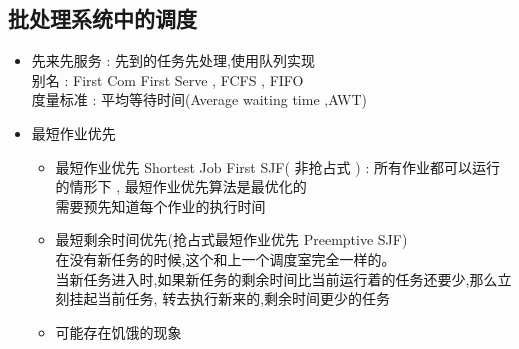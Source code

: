 \documentclass[UTF8,a4paper]{ctexart}
\begin{document}
\subsection{批处理系统中的调度}
\begin{itemize}
	\item 先来先服务 : 先到的任务先处理,使用队列实现\\
	      别名 : First Com First Serve , FCFS , FIFO\\
	      度量标准 : 平均等待时间(Average waiting time ,AWT)
	\item 最短作业优先
	      \begin{itemize}
		      \item 最短作业优先 Shortest Job First SJF( 非抢占式 ) : 所有作业都可以运行的情形下 , 最短作业优先算法是最优化的 \\
		            需要预先知道每个作业的执行时间
		      \item 最短剩余时间优先(抢占式最短作业优先 Preemptive SJF)\\
		            在没有新任务的时候,这个和上一个调度室完全一样的。\\
		            当新任务进入时,如果新任务的剩余时间比当前运行着的任务还要少,那么立刻挂起当前任务,
		            转去执行新来的,剩余时间更少的任务
		      \item 可能存在饥饿的现象
	      \end{itemize}

\end{itemize}
\end{document}
